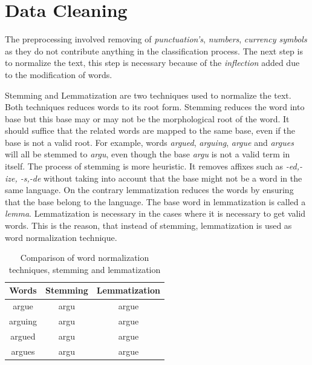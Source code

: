 \section{Data Cleaning}\label{preprocessing}

The preprocessing involved removing of \textit{punctuation's}, \textit{numbers}, \textit{currency symbols} as they do not contribute anything in the classification process. The next step is to normalize the text, this step is necessary because of the \textit{inflection} added due to the modification of words.

Stemming and Lemmatization are two techniques used to normalize the text. Both techniques reduces words to its root form. Stemming reduces the word into base but this base may or may not be the morphological root of the word. It should suffice that the related words are mapped to the same base, even if the base is not a valid root. For example, words \textit{argued}, \textit{arguing}, \textit{argue} and \textit{argues} will all be stemmed to \textit{argu}, even though the base \textit{argu} is not a valid term in itself. The process of stemming is more heuristic. It removes affixes such as \textit{-ed,-ize, -s,-de} without taking into account that the base might not be a word in the same language. On the contrary lemmatization reduces the words by ensuring that the base belong to the language. The base word in lemmatization is called a \textit{lemma}. Lemmatization is necessary in the cases where it is necessary to get valid words. This is the reason, that instead of stemming, lemmatization is used as word normalization technique. 

\begin{table}[!ht]
\centering
\begin{tabular}{ccc}
\hline
\textbf{Words} & \textbf{Stemming} & \textbf{Lemmatization} \\ \hline
argue & argu & argue \\ 
arguing & argu & argue \\ 
argued & argu & argue \\ 
argues & argu & argue \\ \hline
\end{tabular}
\captionsetup{justification=centering,margin=2cm}
\caption{Comparison of word normalization techniques, stemming and lemmatization}
\label{table:StemVSLemma}
\end{table}

